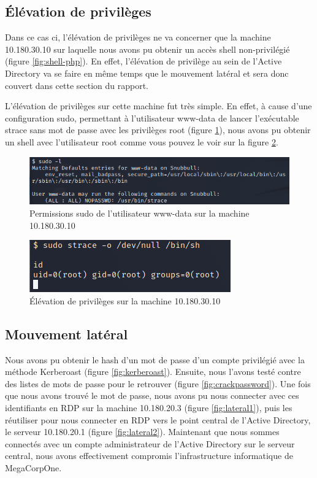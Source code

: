 \documentclass[french,paper=a4,oneside,captions=tableheading]{article}
\begin{document}
\subsection{Élévation de privilèges}

Dans ce cas ci, l'élévation de privilèges ne va concerner que la machine 10.180.30.10 sur laquelle nous avons pu obtenir un accès shell non-privilégié (figure \ref{fig:shell-php}). En effet, l'élévation de privilège au sein de l'Active Directory va se faire en même temps que le mouvement latéral et sera donc couvert dans cette section du rapport.

L'élévation de privilèges sur cette machine fut très simple. En effet, à cause d'une configuration sudo, permettant à l'utilisateur www-data de lancer l'exécutable strace sans mot de passe avec les privilèges root (figure \ref{fig:sudo-1}), nous avons pu obtenir un shell avec l'utilisateur root comme vous pouvez le voir sur la figure \ref{fig:sudo-2}.

\begin{figure}[H]
    \centering
    \includegraphics[width=0.70\linewidth]{images/sudo-l.png}
    \caption{Permissions sudo de l'utilisateur www-data sur la machine 10.180.30.10}
    \label{fig:sudo-1}
\end{figure}

\begin{figure}[H]
    \centering
    \includegraphics[width=0.50\linewidth]{images/sudo-strace.png}
    \caption{Élévation de privilèges sur la machine 10.180.30.10}
    \label{fig:sudo-2}
\end{figure}










\subsection{Mouvement latéral}

Nous avons pu obtenir le hash d'un mot de passe d'un compte privilégié avec la méthode Kerberoast (figure \ref{fig:kerberoast}). Ensuite, nous l'avons testé contre des listes de mots de passe pour le retrouver (figure \ref{fig:crackpassword}). Une fois que nous avons trouvé le mot de passe, nous avons pu nous connecter avec ces identifiants en RDP sur la machine 10.180.20.3 (figure \ref{fig:lateral1}), puis les réutiliser pour nous connecter en RDP vers le point central de l'Active Directory, le serveur 10.180.20.1 (figure \ref{fig:lateral2}). Maintenant que nous sommes connectés avec un compte administrateur de l'Active Directory sur le serveur central, nous avons effectivement compromis l'infrastructure informatique de MegaCorpOne.
\end{document}
